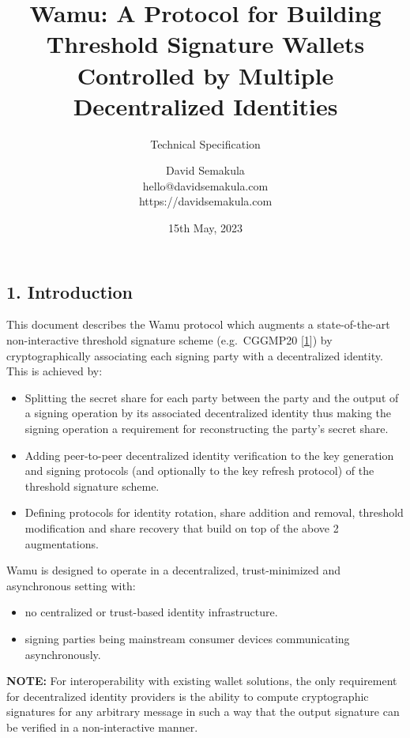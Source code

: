 \documentclass[
]{article}
\title{Wamu: A Protocol for Building Threshold Signature Wallets
Controlled by Multiple Decentralized Identities}
\subtitle{Technical Specification}
\author{David Semakula\\
hello@davidsemakula.com\\
https://davidsemakula.com}
\date{15th May, 2023}
\providecommand{\tightlist}{%
  \setlength{\itemsep}{0pt}\setlength{\parskip}{0pt}}
\begin{document}
\maketitle

{
\setcounter{tocdepth}{3}
\tableofcontents
}
\hypertarget{introduction}{%
\subsection{1. Introduction}\label{introduction}}

This document describes the Wamu protocol which augments a
state-of-the-art non-interactive threshold signature scheme
(e.g.~CGGMP20 {[}\protect\hyperlink{ref-cggmp20}{1}{]}) by
cryptographically associating each signing party with a decentralized
identity. This is achieved by:

\begin{itemize}
\tightlist
\item
  Splitting the secret share for each party between the party and the
  output of a signing operation by its associated decentralized identity
  thus making the signing operation a requirement for reconstructing the
  party's secret share.
\item
  Adding peer-to-peer decentralized identity verification to the key
  generation and signing protocols (and optionally to the key refresh
  protocol) of the threshold signature scheme.
\item
  Defining protocols for identity rotation, share addition and removal,
  threshold modification and share recovery that build on top of the
  above 2 augmentations.
\end{itemize}

Wamu is designed to operate in a decentralized, trust-minimized and
asynchronous setting with:

\begin{itemize}
\tightlist
\item
  no centralized or trust-based identity infrastructure.
\item
  signing parties being mainstream consumer devices communicating
  asynchronously.
\end{itemize}

\textbf{NOTE:} For interoperability with existing wallet solutions, the
only requirement for decentralized identity providers is the ability to
compute cryptographic signatures for any arbitrary message in such a way
that the output signature can be verified in a non-interactive manner.
\end{document}
